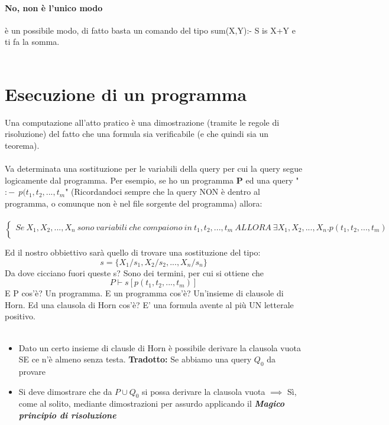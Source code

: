 \documentclass[12pt, a4paper, openany, oneside]{book}
\begin{document}
{\paragraph{No, non è l'unico modo} è un possibile modo, di fatto basta un comando
del tipo sum(X,Y):- S is X+Y e ti fa la somma.
\\ \\
\section{Esecuzione di un programma}
Una computazione all'atto pratico è una dimostrazione (tramite le regole di 
risoluzione) del fatto che una formula sia verificabile (e che quindi sia un 
teorema).
\\ \\
Va determinata una sostituzione per le variabili della query per cui la query
segue logicamente dal programma.
Per esempio, se ho un programma \textbf{P} ed una query "$:- ~~ p(t_{1}, t_{2}, ..., t_{m}$"
(Ricordandoci sempre che la query NON è dentro al programma, o comunque non è
nel file sorgente del programma) allora: \\ \\
$$\begin{cases}
Se ~ X_{1}, X_{2}, ..., X_{n} ~ sono ~ variabili ~ che ~ compaiono ~ in
~ t_{1}, t_{2}, ..., t_{m} ~ ALLORA ~ \exists X_{1}, X_{2}, ..., X_{n} . 
p(t_{1}, t_{2}, ..., t_{m}) \\	
\end{cases}$$

Ed il nostro obbiettivo sarà quello di trovare una sostituzione del tipo:
$$s = \{X_{1}/s_{1}, X_{2}/s_{2}, ..., X_{n}/s_{n}\}$$
Da dove cicciano fuori queste s? Sono dei termini, per cui si ottiene che
$$P \vdash s[p(t_{1}, t_{2}, ..., t_{m})]$$
E P cos'è? Un programma. E un programma cos'è? Un'insieme di clausole di Horn.
Ed una clausola di Horn cos'è? E' una formula avente al più UN letterale positivo.
\\ \\
\begin{itemize}
	\item Dato un certo insieme di clausle di Horn è possibile derivare la clausola vuota
	SE ce n'è almeno senza testa. \textbf{Tradotto: } Se abbiamo una query $Q_{0}$ da
	provare
	\item Si deve dimostrare che da $P \cup {Q_{0}}$ si possa derivare la
	clausola vuota $\implies$ Sì, come al solito, mediante dimostrazioni per
	assurdo applicando il \color{red} \textbf{\textit{Magico principio di risoluzione
	}} \color{black}
\end{itemize}

}
\end{document}
